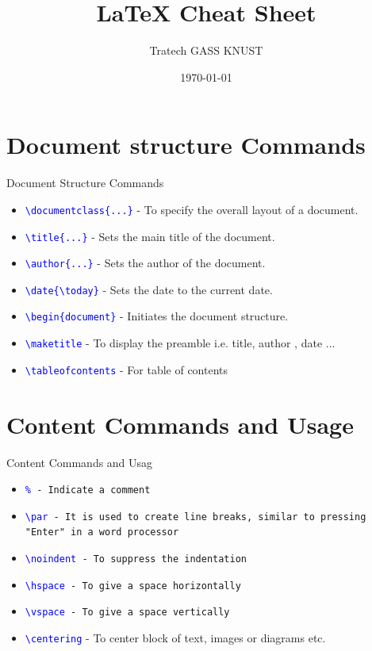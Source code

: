 \documentclass{beamer}
\title{LaTeX Cheat Sheet}
\author{Tratech GASS KNUST}
\date{\today}
\begin{document}
	\newcommand{\imgHeight}{100pt}
	\newcommand{\imgWidth}{100pt}
	
	\begin{frame}
		\titlepage
	\end{frame}
	
	\begin{frame}
		\tableofcontents
	\end{frame}
	
	\section{Document structure Commands}
	\begin{frame}{ Document Structure Commands}
		\begin{itemize}
			\item \texttt{\textcolor{blue}{\textbackslash documentclass\{...\}}} - To specify the overall layout of a document.
			\item \texttt{\textcolor{blue}{\textbackslash title\{...\}}} - Sets the main title of the document.
			\item \texttt{\textcolor{blue}{\textbackslash author\{...\}}} - Sets the author of the document.
			\item \texttt{\textcolor{blue}{\textbackslash date\{\textbackslash today\}}} - Sets the date to the current date.
			\item \texttt{\textcolor{blue}{\textbackslash begin\{document\}}} - Initiates the document structure.
			\item \texttt{\textcolor{blue}{\textbackslash maketitle}} - To display the preamble i.e. title, author , date ...
			\item \texttt{\textcolor{blue}{\textbackslash tableofcontents}} - For table of contents
		\end{itemize}
		
	\end{frame}
	
	\section{Content Commands and Usage}
	\begin{frame}{ Content Commands and Usag}
		\begin{itemize}
			\item \texttt{\textcolor{blue}{\%} - Indicate a comment}
			\item \texttt{\textcolor{blue}{\textbackslash par} -  It is used to create line breaks, similar to pressing "Enter" in a word processor}
			\item \texttt{\textcolor{blue}{\textbackslash noindent} - To suppress the indentation}
			\item \texttt{\textcolor{blue}{\textbackslash hspace} - To give a space horizontally}
			\item \texttt{\textcolor{blue}{\textbackslash vspace} - To give a space vertically}
			\item \texttt{\textcolor{blue}{\textbackslash centering}} - To center block of text, images or diagrams etc.
		\end{itemize}
	\end{frame}
\end{document}
